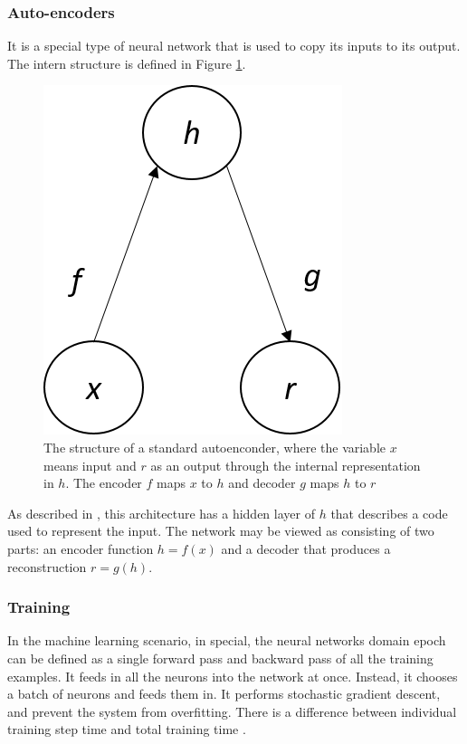\subsubsection{Auto-encoders}\label{auto-encoder}

It is a special type of neural network that is used to copy its inputs to its output. The intern structure is defined in Figure \ref{fig:autoencoder}. 

\begin{figure}[H]
\centering
\includegraphics[scale=0.7]{imagens/autoencoder.png}
\caption{The structure of a standard autoenconder, where the variable $x$ means input and $r$ as an output through the internal representation in $h$. The encoder $f$ maps $x$ to $h$ and decoder $g$ maps $h$ to $r$}
\label{fig:autoencoder}
\end{figure}

As described in \cite{yang2020feedback}, this architecture has a hidden layer of $h$ that describes a code used to represent the input. The network may be viewed as consisting of two parts: an encoder function $h=f(x)$ and a decoder that produces a reconstruction $r=g(h)$.

\subsubsection{Training}

In the machine learning scenario, in special, the neural networks domain epoch can be defined as a single forward pass and backward pass of all the training examples. It feeds in all the neurons into the network at once. Instead, it chooses a batch of neurons and feeds them in. It performs stochastic gradient descent, and prevent the system from overfitting. There is a difference between individual training step time and total training time \cite{pascanu2013difficulty}. 


